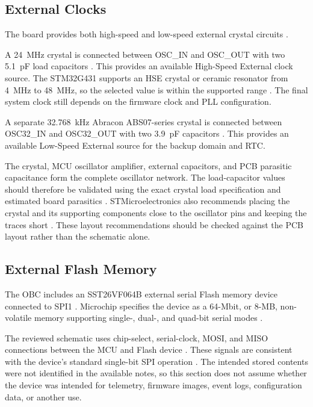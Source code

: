 \documentclass[10pt]{../datasheet}
\begin{document}
\subsection{External Clocks}

The board provides both high-speed and low-speed external crystal circuits
\cite{obc-schematic}.

A 24~MHz crystal is connected between OSC\_IN and OSC\_OUT with two 5.1~pF load
capacitors \cite{obc-schematic}. This provides an available High-Speed External
clock source. The STM32G431 supports an HSE crystal or ceramic resonator from
4~MHz to 48~MHz, so the selected value is within the supported range
\cite{stm32g431-datasheet}. The final system clock still depends on the
firmware clock and PLL configuration.

A separate 32.768~kHz Abracon ABS07-series crystal is connected between
OSC32\_IN and OSC32\_OUT with two 3.9~pF capacitors
\cite{obc-schematic,abracon-abs07}. This provides an available Low-Speed
External source for the backup domain and RTC.

The crystal, MCU oscillator amplifier, external capacitors, and PCB parasitic
capacitance form the complete oscillator network. The load-capacitor values
should therefore be validated using the exact crystal load specification and
estimated board parasitics \cite{stm32-oscillator-guide,abracon-abs07}.
STMicroelectronics also recommends placing the crystal and its supporting
components close to the oscillator pins and keeping the traces short
\cite{stm32-oscillator-guide}. These layout recommendations should be checked
against the PCB layout rather than the schematic alone.

\subsection{External Flash Memory}

The OBC includes an SST26VF064B external serial Flash memory device connected
to SPI1 \cite{obc-schematic}. Microchip specifies the device as a 64-Mbit, or
8-MB, non-volatile memory supporting single-, dual-, and quad-bit serial modes
\cite{sst26vf064b-datasheet}.

The reviewed schematic uses chip-select, serial-clock, MOSI, and MISO
connections between the MCU and Flash device \cite{obc-schematic}. These
signals are consistent with the device's standard single-bit SPI operation
\cite{sst26vf064b-datasheet}. The intended stored contents were not identified
in the available notes, so this section does not assume whether the device was
intended for telemetry, firmware images, event logs, configuration data, or
another use.
\end{document}

